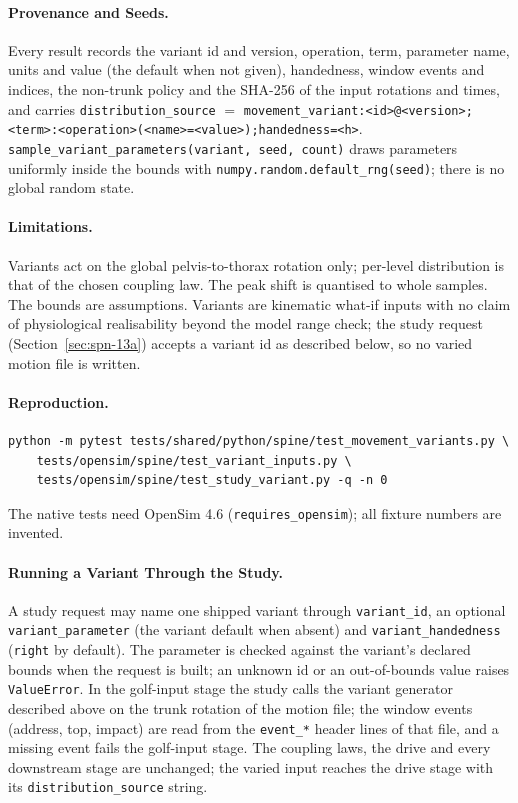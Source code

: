 \paragraph{Provenance and Seeds.}
Every result records the variant id and version, operation, term, parameter
name, units and value (the default when not given), handedness, window events
and indices, the non-trunk policy and the SHA-256 of the input rotations and
times, and carries
\texttt{distribution\_source} $=$
\texttt{movement\_variant:<id>@<version>;<term>:<operation>(<name>=<value>);handedness=<h>}.
\texttt{sample\_variant\_parameters(variant, seed, count)} draws parameters
uniformly inside the bounds with \texttt{numpy.random.default\_rng(seed)}; there
is no global random state.

\paragraph{Limitations.}
Variants act on the global pelvis-to-thorax rotation only; per-level
distribution is that of the chosen coupling law. The peak shift is quantised to
whole samples. The bounds are assumptions. Variants are kinematic what-if
inputs with no claim of physiological realisability beyond the model range
check; the study request (Section~\ref{sec:spn-13a}) accepts a variant id
as described below, so no varied motion file is written.

\paragraph{Reproduction.}
\begin{verbatim}
python -m pytest tests/shared/python/spine/test_movement_variants.py \
    tests/opensim/spine/test_variant_inputs.py \
    tests/opensim/spine/test_study_variant.py -q -n 0
\end{verbatim}
The native tests need OpenSim 4.6 (\texttt{requires\_opensim}); all fixture
numbers are invented.

\paragraph{Running a Variant Through the Study.}
A study request may name one shipped variant through \texttt{variant\_id},
an optional \texttt{variant\_parameter} (the variant default when absent) and
\texttt{variant\_handedness} (\texttt{right} by default).  The parameter is
checked against the variant's declared bounds when the request is built; an
unknown id or an out-of-bounds value raises \texttt{ValueError}.  In the
golf-input stage the study calls the variant generator described above on the
trunk rotation of the motion file; the window events (address, top, impact)
are read from the \texttt{event\_*} header lines of that file, and a missing
event fails the golf-input stage.  The coupling laws, the drive and every
downstream stage are unchanged; the varied input reaches the drive stage with
its \texttt{distribution\_source} string.


